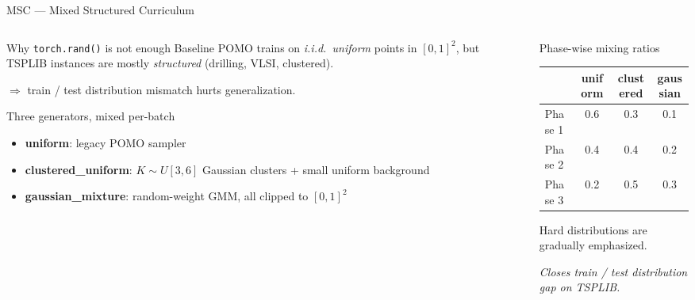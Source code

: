\documentclass[aspectratio=169,11pt]{beamer}
\begin{document}
\begin{frame}{MSC --- Mixed Structured Curriculum}
  \begin{columns}[T,totalwidth=\textwidth]
    \begin{column}{0.55\textwidth}
      \begin{block}{Why \texttt{torch.rand()} is not enough}
        Baseline POMO trains on \emph{i.i.d.\ uniform} points in $[0,1]^2$,
        but TSPLIB instances are mostly \emph{structured} (drilling, VLSI, clustered).

        $\Rightarrow$ train / test distribution mismatch hurts generalization.
      \end{block}
      \begin{block}{Three generators, mixed per-batch}
        \begin{itemize}\setlength{\itemsep}{2pt}
          \item \textbf{uniform}: legacy POMO sampler
          \item \textbf{clustered\_uniform}: $K\sim U[3,6]$ Gaussian clusters + small uniform background
          \item \textbf{gaussian\_mixture}: random-weight GMM, all clipped to $[0,1]^2$
        \end{itemize}
      \end{block}
    \end{column}
    \begin{column}{0.42\textwidth}
      \begin{block}{Phase-wise mixing ratios}
        \footnotesize
        \begin{tabularx}{\linewidth}{lccc}
          \toprule
                  & uniform & clustered & gaussian \\
          \midrule
          Phase 1 & 0.6     & 0.3       & 0.1      \\
          Phase 2 & 0.4     & 0.4       & 0.2      \\
          Phase 3 & 0.2     & 0.5       & 0.3      \\
          \bottomrule
        \end{tabularx}
        \vspace{0.2cm}

        Hard distributions are gradually emphasized.
      \end{block}
      \centering
      {\color{sdmblue}\itshape Closes train / test distribution gap on TSPLIB.}
    \end{column}
  \end{columns}
\end{frame}
\end{document}
